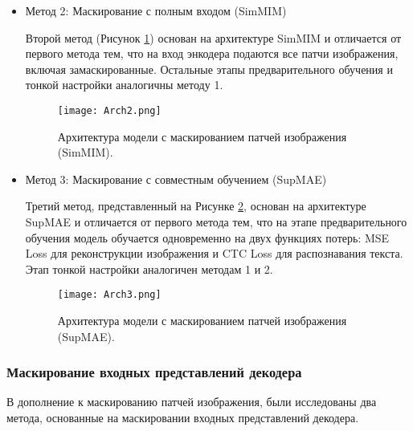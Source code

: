 \begin{itemize}
   \item Метод 2: Маскирование с полным входом (SimMIM)

   Второй метод (Рисунок \ref{4}) основан на архитектуре SimMIM \cite{xie2021simmim} и отличается от первого метода тем, что на вход энкодера подаются все патчи изображения, включая замаскированные. Остальные этапы предварительного обучения и тонкой настройки аналогичны методу 1.

   \begin{figure}[H]
     \centering
     \texttt{[image: Arch2.png]}
     \caption{Архитектура модели с маскированием патчей изображения (SimMIM).}
     \label{4} 
   \end{figure}

   \item Метод 3: Маскирование с совместным обучением (SupMAE)
   
   Третий метод, представленный на Рисунке \ref{5}, основан на архитектуре SupMAE \cite{gao2022supmae} и отличается от первого метода тем, что на этапе предварительного обучения модель обучается одновременно на двух функциях потерь: MSE Loss для реконструкции изображения и CTC Loss для распознавания текста. Этап тонкой настройки аналогичен методам 1 и 2.

   \begin{figure}[H]
     \centering
     \texttt{[image: Arch3.png]}
     \caption{Архитектура модели с маскированием патчей изображения (SupMAE).}
     \label{5} 
   \end{figure}
\end{itemize}
   
\subsubsection{Маскирование входных представлений декодера}

В дополнение к маскированию патчей изображения, были исследованы два метода, основанные на маскировании входных представлений декодера.

